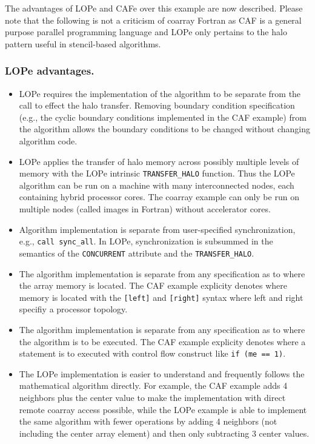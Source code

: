 The advantages of LOPe and CAFe over this example are now described.  Please note that the following
is not a criticism of coarray Fortran as CAF is a general purpose parallel programming language and
LOPe only pertains to the halo pattern useful in stencil-based algorithms.

\subsubsection{LOPe advantages.}
\begin{itemize}

\item
LOPe requires the implementation of the algorithm to be separate from the call to effect the halo
transfer.  Removing boundary condition specification (e.g., the cyclic boundary conditions
implemented in the CAF example) from the algorithm allows the boundary conditions to be changed
without changing algorithm code.

\item
LOPe applies the transfer of halo memory across possibly multiple levels of memory with the LOPe
intrinsic \texttt{TRANSFER\_HALO} function.  Thus the LOPe algorithm can be run on a machine with
many interconnected nodes, each containing hybrid processor cores.  The coarray example can only be
run on multiple nodes (called images in Fortran) without accelerator cores.

\item
Algorithm implementation is separate from user-specified synchronization, e.g., \texttt{call
  sync\_all}.  In LOPe, synchronization is subsummed in the semantics of the \texttt{CONCURRENT}
attribute and the \texttt{TRANSFER\_HALO}.

\item
The algorithm implementation is separate from any specification as to where the array
memory is located.  The CAF example explicity denotes where memory is located with the
\texttt{[left]} and \texttt{[right]} syntax where left and right specifiy a processor
topology.

\item
The algorithm implementation is separate from any specification as to where the algorithm
is to be executed.  The CAF example explicity denotes where a statement is to executed
with control flow construct like \texttt{if (me == 1)}.

\item
The LOPe implementation is easier to understand and frequently follows the mathematical
algorithm directly.  For example, the CAF example adds 4 neighbors plus the center value
to make the implementation with direct remote coarray access possible, while the LOPe
example is able to implement the same algorithm with fewer operations by adding 4
neighbors (not including the center array element) and then only subtracting 3 center
values.


\end{itemize}
